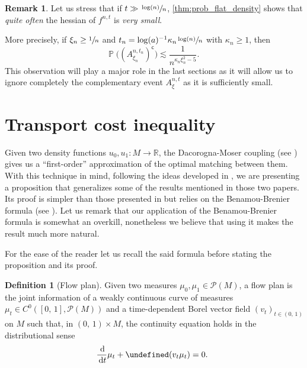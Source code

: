 \documentclass[10pt]{amsart}
\newcounter{results}[section]
\theoremstyle{plain}
\theoremstyle{definition}
\newtheorem{remark}[remark]{Remark}
\newtheorem{definition}[definition]{Definition}
\numberwithin{equation}{section}
\newcommand{\RR}{\ensuremath{\mathbb R}}
\renewcommand{\complement}{\ensuremath{\mathsf{c}}}\newcommand{\de}{\ensuremath{\,\mathrm d}}
\newcommand{\oo}[2]{\ensuremath{\left(#1,\,#2\right)}}
\newcommand{\bP}[1]{\ensuremath{\operatorname{\mathbb{P}}\bigl(#1\bigr)}}
\newcommand{\prob}{\ensuremath{\mathcal{P}}}
\newcommand{\cc}[2]{\ensuremath{\left[#1,\,#2\right]}}
\newcommand{\fullstop}{\ensuremath{\text{. }}}
\let\div\undefined
\DeclareMathOperator{\div}{div}
\begin{document}
\begin{remark}\label{rem:complement_event_is_negligible}
Let us stress that if $t\gg\sfrac{\log(n)}{n}$,
\cref{thm:prob_flat_density} shows that \emph{quite often} the hessian of $f^{n,t}$ is \emph{very small}.

More precisely, if $\xi_n\ge\sfrac 1n$ and $t_n = \log(a)^{-1}\kappa_n \sfrac{\log(n)}{n}$ with $\kappa_n\ge 1$, then
\begin{equation*}
\bP{(A^{n,t_n}_{\xi_n})^{\complement}} \lesssim \frac{1}{n^{\kappa_n\xi_n^2-5}} \fullstop
\end{equation*}
This observation will play a major role in the last sections as it will
allow us to ignore completely the complementary event $A^{n,t}_\xi$ as it is sufficiently small.
\end{remark}

\section{Transport cost inequality}\label{sec:transport_ineq}
Given two density functions $u_0,u_1:M\to\RR$, the Dacorogna-Moser coupling (see \cite[16-17]{Villani09}) gives
us a ``first-order'' approximation of the optimal matching between them.
With this technique in mind, following the ideas developed in \cite{Ambrosio-Stra-Trevisan2018,Ledoux2017},
we are presenting a proposition that generalizes some of the results mentioned in those two papers.
Its proof is simpler than those presented in \cite{Ambrosio-Stra-Trevisan2018,Ledoux2017}
but relies on the Benamou-Brenier formula (see \cite{Benamou-Brenier00}).
Let us remark that our application of the Benamou-Brenier formula is somewhat an overkill,
nonetheless we believe that using it makes the result much more natural.

For the ease of the reader let us recall the said formula before stating the proposition and its proof.
\begin{definition}[Flow plan]
Given two measures $\mu_0,\mu_1\in\prob(M)$, a flow plan is the joint information of a weakly
continuous curve of measures $\mu_t\in C^0(\cc01, \prob(M))$ and a time-dependent Borel
vector field $(v_t)_{t\in \oo01}$ on $M$ such that, in $\oo01\times M$,
the continuity equation holds in the distributional sense
\begin{equation*}
\frac{\de}{\de t}\mu_t+\div(v_t\mu_t)=0\fullstop
\end{equation*}
\end{definition}
\end{document}
